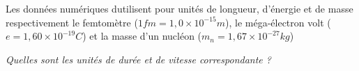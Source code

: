 Les données numériques dutilisent pour unités de longueur, d’énergie et de masse respectivement le femtomètre ($1 fm = 1,0 \times 10^{-15}m$), le méga-électron volt ($e = 1,60 \times 10^{-19} C$) et la masse d’un nucléon ($m_n = 1,67 \times 10^{-27} kg$)
\begin{Exercise}\it
Quelles sont les unités de durée et de vitesse correspondante ?
\end{Exercise}
\begin{Answer}

\end{Answer}

\medskip

